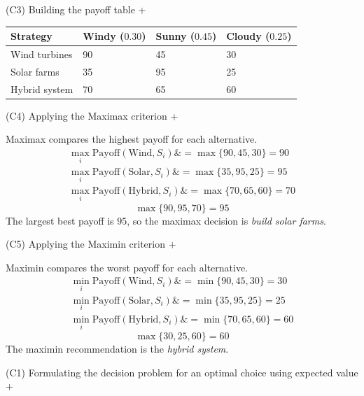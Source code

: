 \documentclass[11pt]{article}
\begin{document}
	
	
	
	
	
	(C3) Building the payoff table
	+
	
	
	\begin{center}
		\begin{tabular}{llll}
			\toprule
			Strategy & Windy
			($0.30$) & Sunny
			($0.45$) & Cloudy
			($0.25$) \\
			\midrule
			Wind turbines & 90 & 45 & 30 \\
			Solar farms & 35 & 95 & 25 \\
			Hybrid system & 70 & 65 & 60 \\
			\bottomrule
		\end{tabular}
	\end{center}
	
	
	
	
	
	
	(C4) Applying the Maximax criterion
	+
	
	
	Maximax compares the highest payoff for each alternative.
	\[
	\begin{aligned}
		\max_i \text{Payoff}(\text{Wind}, S_i) \&= \max\{90, 45, 30\} = 90 \\
		\max_i \text{Payoff}(\text{Solar}, S_i) \&= \max\{35, 95, 25\} = 95 \\
		\max_i \text{Payoff}(\text{Hybrid}, S_i) \&= \max\{70, 65, 60\} = 70
	\end{aligned}
	\]
	\[
	\max\{90, 95, 70\} = 95
	\]
The largest best payoff is $95$, so the maximax decision is \emph{build solar farms}.
	
	
	
	
	
	(C5) Applying the Maximin criterion
	+
	
	
	Maximin compares the worst payoff for each alternative.
	\[
	\begin{aligned}
		\min_i \text{Payoff}(\text{Wind}, S_i) \&= \min\{90, 45, 30\} = 30 \\
		\min_i \text{Payoff}(\text{Solar}, S_i) \&= \min\{35, 95, 25\} = 25 \\
		\min_i \text{Payoff}(\text{Hybrid}, S_i) \&= \min\{70, 65, 60\} = 60
	\end{aligned}
	\]
	\[
	\max\{30, 25, 60\} = 60
	\]
	The maximin recommendation is the \emph{hybrid system}.
	
	
	
	
	
	(C1) Formulating the decision problem for an optimal choice using expected value
	+
	
\end{document}
